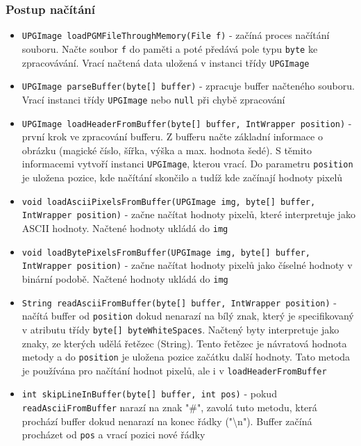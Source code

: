 \documentclass[12pt]{report}
\begin{document}
\subsubsection{Postup načítání}
\begin{itemize}
  \item \texttt{UPGImage loadPGMFileThroughMemory(File f)} - začíná proces načítání souboru. Načte soubor
  	\texttt{f} do paměti a poté předává pole typu \texttt{byte} ke zpracovávání. Vrací načtená data uložená
	v instanci třídy \texttt{UPGImage}
  \item \texttt{UPGImage parseBuffer(byte[] buffer)} - zpracuje buffer načteného souboru. Vrací instanci třídy
  	\texttt{UPGImage} nebo \texttt{null} při chybě zpracování
  \item \texttt{UPGImage loadHeaderFromBuffer(byte[] buffer, IntWrapper position)} - první krok ve zpracování
	bufferu. Z bufferu načte základní informace o obrázku (magické číslo, šířka, výška a max. hodnota šedé).
	S těmito informacemi vytvoří instanci \texttt{UPGImage}, kterou vrací. Do parametru \texttt{position}
	je uložena pozice, kde načítání skončilo a tudíž kde začínají hodnoty pixelů
  \item \texttt{void loadAsciiPixelsFromBuffer(UPGImage img, byte[] buffer, IntWrapper position)} - začne načítat
  	hodnoty pixelů, které interpretuje jako ASCII hodnoty. Načtené hodnoty ukládá do \texttt{img}
  \item \texttt{void loadBytePixelsFromBuffer(UPGImage img, byte[] buffer, IntWrapper position)} - začne načítat
  	hodnoty pixelů jako číselné hodnoty v binární podobě. Načtené hodnoty ukládá do \texttt{img}
  \item \texttt{String readAsciiFromBuffer(byte[] buffer, IntWrapper position)} - načítá buffer od
  	\texttt{position} dokud nenarazí na bílý znak, který je specifikovaný v atributu třídy
	\texttt{byte[] byteWhiteSpaces}. Načtený byty interpretuje jako znaky, ze kterých udělá řetězec (String).
	Tento řetězec je návratová hodnota metody a do \texttt{position} je uložena pozice začátku další hodnoty.
	Tato metoda je používána pro načítání hodnot pixelů, ale i v \texttt{loadHeaderFromBuffer}
  \item \texttt{int skipLineInBuffer(byte[] buffer, int pos)} - pokud \texttt{readAsciiFromBuffer} narazí na znak
  	"\#", zavolá tuto metodu, která prochází buffer dokud nenarazí na konec řádky ("\textbackslash n"). Buffer začíná
	procházet od \texttt{pos} a vrací pozici nové řádky
\end{itemize}
%
\end{document}
